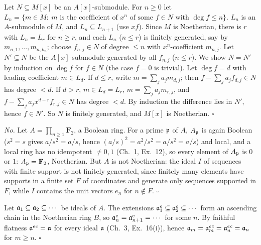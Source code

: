 \documentclass[11pt]{article}
\begin{document}
\pf
Let $N\subseteq M[x]$ be an $A[x]$-submodule. For $n\ge0$ let $L_n=\{m\in M:\ m\text{ is the coefficient of }x^n\text{ of some }f\in N\text{ with }\deg f\le n\}$. $L_n$ is an $A$-submodule of $M$, and $L_n\subseteq L_{n+1}$ (use $xf$). Since $M$ is Noetherian, there is $r$ with $L_n=L_r$ for $n\ge r$, and each $L_n$ ($n\le r$) is finitely generated, say by $m_{n,1},\dots,m_{n,k_n}$; choose $f_{n,j}\in N$ of degree $\le n$ with $x^n$-coefficient $m_{n,j}$. Let $N'\subseteq N$ be the $A[x]$-submodule generated by all $f_{n,j}$ ($n\le r$). We show $N=N'$ by induction on $\deg f$ for $f\in N$ (the case $f=0$ is trivial). Let $\deg f=d$ with leading coefficient $m\in L_d$.
If $d\le r$, write $m=\sum_ja_jm_{d,j}$; then $f-\sum_ja_jf_{d,j}\in N$ has degree $<d$.
If $d>r$, $m\in L_d=L_r$, $m=\sum_ja_jm_{r,j}$, and $f-\sum_ja_jx^{d-r}f_{r,j}\in N$ has degree $<d$.
By induction the difference lies in $N'$, hence $f\in N'$. So $N$ is finitely generated, and $M[x]$ is Noetherian. \hfill$\square$

\pf
\emph{No.} Let $A=\prod_{n\ge1}\mathbf F_2$, a Boolean ring. For a prime $\mathfrak p$ of $A$, $A_\mathfrak p$ is again Boolean ($s^2=s$ gives $a/s^2=a/s$, hence $(a/s)^2=a^2/s^2=a/s^2=a/s$) and local, and a local ring has no idempotent $\ne0,1$ (Ch.~1, Ex.~12), so every element of $A_\mathfrak p$ is $0$ or $1$: $A_\mathfrak p=\mathbf F_2$, Noetherian. But $A$ is not Noetherian: the ideal $I$ of sequences with finite support is not finitely generated, since finitely many elements have supports in a finite set $F$ of coordinates and generate only sequences supported in $F$, while $I$ contains the unit vectors $e_n$ for $n\notin F$. \hfill$\square$

\pf
Let $\mathfrak a_1\subseteq\mathfrak a_2\subseteq\cdots$ be ideals of $A$. The extensions $\mathfrak a_1^e\subseteq\mathfrak a_2^e\subseteq\cdots$ form an ascending chain in the Noetherian ring $B$, so $\mathfrak a_n^e=\mathfrak a_{n+1}^e=\cdots$ for some $n$. By faithful flatness $\mathfrak a^{ec}=\mathfrak a$ for every ideal $\mathfrak a$ (Ch.~3, Ex.~16(i)), hence $\mathfrak a_m=\mathfrak a_m^{ec}=\mathfrak a_n^{ec}=\mathfrak a_n$ for $m\ge n$. \hfill$\square$
\end{document}
